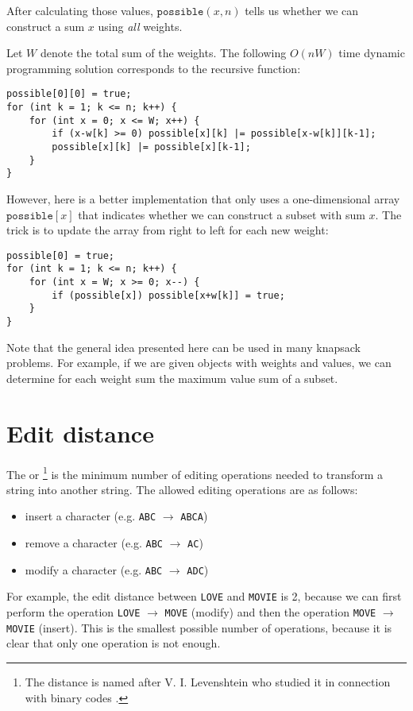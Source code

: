 After calculating those values, $\texttt{possible}(x,n)$
tells us whether we can construct a
sum $x$ using \emph{all} weights.

Let $W$ denote the total sum of the weights.
The following $O(nW)$ time
dynamic programming solution
corresponds to the recursive function:
\begin{lstlisting}
possible[0][0] = true;
for (int k = 1; k <= n; k++) {
    for (int x = 0; x <= W; x++) {
        if (x-w[k] >= 0) possible[x][k] |= possible[x-w[k]][k-1];
        possible[x][k] |= possible[x][k-1];
    }
}
\end{lstlisting}

However, here is a better implementation that only uses
a one-dimensional array $\texttt{possible}[x]$
that indicates whether we can construct a subset with sum $x$.
The trick is to update the array from right to left for
each new weight:
\begin{lstlisting}
possible[0] = true;
for (int k = 1; k <= n; k++) {
    for (int x = W; x >= 0; x--) {
        if (possible[x]) possible[x+w[k]] = true;
    }
}
\end{lstlisting}

Note that the general idea presented here can be used
in many knapsack problems.
For example, if we are given objects with weights and values,
we can determine for each weight sum the maximum value
sum of a subset.

\section{Edit distance}


The  or \footnote{The distance
is named after V. I. Levenshtein who studied it in connection with binary codes \cite{lev66}.}
is the minimum number of editing operations
needed to transform a string
into another string.
The allowed editing operations are as follows:
\begin{itemize}
\item insert a character (e.g. \texttt{ABC} $\rightarrow$ \texttt{ABCA})
\item remove a character (e.g. \texttt{ABC} $\rightarrow$ \texttt{AC})
\item modify a character (e.g. \texttt{ABC} $\rightarrow$ \texttt{ADC})
\end{itemize}

For example, the edit distance between
\texttt{LOVE} and \texttt{MOVIE} is 2,
because we can first perform the operation
 \texttt{LOVE} $\rightarrow$ \texttt{MOVE}
(modify) and then the operation
\texttt{MOVE} $\rightarrow$ \texttt{MOVIE}
(insert).
This is the smallest possible number of operations,
because it is clear that only one operation is not enough.

